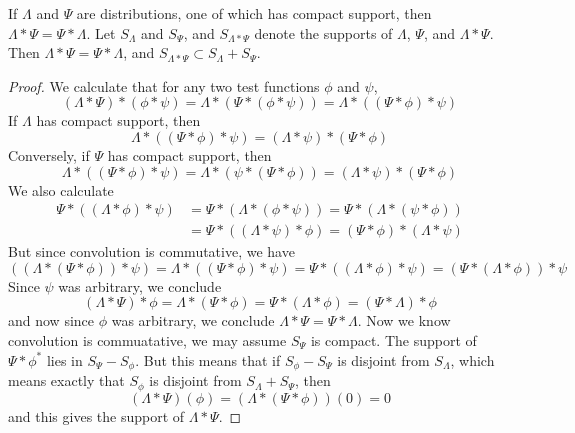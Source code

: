 \begin{theorem}
    If $\Lambda$ and $\Psi$ are distributions, one of which has compact support, then $\Lambda * \Psi = \Psi * \Lambda$. Let $S_\Lambda$ and $S_\Psi$, and $S_{\Lambda * \Psi}$ denote the supports of $\Lambda$, $\Psi$, and $\Lambda * \Psi$. Then $\Lambda * \Psi = \Psi * \Lambda$, and $S_{\Lambda * \Psi} \subset S_\Lambda + S_\Psi$.
\end{theorem}
\begin{proof}
    We calculate that for any two test functions $\phi$ and $\psi$,
    \[ (\Lambda * \Psi) * (\phi * \psi) = \Lambda * (\Psi * (\phi * \psi)) = \Lambda * ((\Psi * \phi) * \psi) \]
    If $\Lambda$ has compact support, then
    \[ \Lambda * ((\Psi * \phi) * \psi) = (\Lambda * \psi) * (\Psi * \phi) \]
    Conversely, if $\Psi$ has compact support, then
    \[ \Lambda * ((\Psi * \phi) * \psi) = \Lambda * (\psi * (\Psi * \phi)) = (\Lambda * \psi) * (\Psi * \phi) \]
    We also calculate
    \begin{align*}
        \Psi * ((\Lambda * \phi) * \psi) &= \Psi * (\Lambda * (\phi * \psi)) = \Psi * (\Lambda * (\psi * \phi))\\
        &= \Psi * ((\Lambda * \psi) * \phi) = (\Psi * \phi) * (\Lambda * \psi)
    \end{align*}
    But since convolution is commutative, we have
    \[ ((\Lambda * (\Psi * \phi)) * \psi) = \Lambda * ((\Psi * \phi) * \psi) = \Psi * ((\Lambda * \phi) * \psi) = (\Psi * (\Lambda * \phi)) * \psi \]
    Since $\psi$ was arbitrary, we conclude
    \[ (\Lambda * \Psi) * \phi = \Lambda * (\Psi * \phi) = \Psi * (\Lambda * \phi) = (\Psi * \Lambda) * \phi \]
    and now since $\phi$ was arbitrary, we conclude $\Lambda * \Psi = \Psi * \Lambda$. Now we know convolution is commuatative, we may assume $S_\Psi$ is compact. The support of $\Psi * \phi^*$ lies in $S_\Psi - S_\phi$. But this means that if $S_\phi - S_\Psi$ is disjoint from $S_\Lambda$, which means exactly that $S_\phi$ is disjoint from $S_\Lambda + S_\Psi$, then
    \[ (\Lambda * \Psi)(\phi) = (\Lambda * (\Psi * \phi))(0) = 0 \]
    and this gives the support of $\Lambda * \Psi$.
\end{proof}

